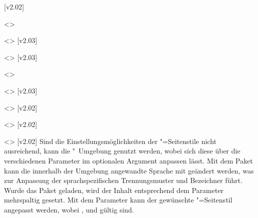 \begin{DeclareEntity*}{}
\begin{DeclareEntity*}{}
\begin{DeclareEntity*}{}
\begin{Declaration}
  {}
\begin{Declaration}
  {}
\begin{Declaration}
  {}
\begin{Declaration}
  {}
  [v2.02]
\begin{Declaration}
  {}
  <>
\begin{Declaration}
  {}
  <>
  [v2.03]
\begin{Declaration}
  {}
  <>
  [v2.03]
\begin{Declaration}
  {}
  <>
\begin{Declaration}
  {}
  <>
  [v2.03]
\begin{Declaration}
  {}
  <>
  [v2.02]
\begin{Declaration}
  {}
  <>
  [v2.02]
\begin{Declaration}
  {}
  <>
  [v2.02]
Sind die Einstellungsmöglichkeiten der "=Seitenstile 
nicht ausreichend, kann die "~Umgebung genutzt werden, 
wobei sich diese über die verschiedenen Parameter im optionalen Argument 
anpassen lässt. Mit dem Paket  kann die innerhalb der Umgebung 
angewandte Sprache mit  geändert 
werden, was zur Anpassung der sprachspezifischen Trennungsmuster und Bezeichner 
führt. Wurde das Paket  geladen, wird der Inhalt entsprechend 
dem Parameter  mehrspaltig gesetzt. 
Mit dem Parameter  kann der 
gewünschte  "=Seitenstil angepasst werden, wobei 
,  und  gültig sind. 


\end{Declaration}
\end{Declaration}
\end{Declaration}
\end{Declaration}
\end{Declaration}
\end{Declaration}
\end{Declaration}
\end{Declaration}
\end{Declaration}
\end{Declaration}
\end{Declaration}
\end{Declaration}
\end{DeclareEntity*}
\end{DeclareEntity*}
\end{DeclareEntity*}

